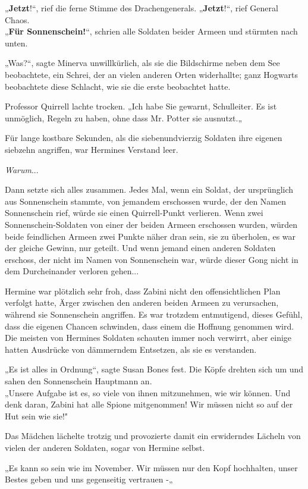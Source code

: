 {„\textbf{Jetzt}!“, rief die ferne Stimme des Drachengenerals. „\textbf{Jetzt}!“, rief General Chaos.\\ „\textbf{Für Sonnenschein!}“, schrien alle Soldaten beider Armeen und stürmten nach unten.

„Was?“, sagte Minerva unwillkürlich, als sie die Bildschirme neben dem See beobachtete, ein Schrei, der an vielen anderen Orten widerhallte; ganz Hogwarts beobachtete diese Schlacht, wie sie die erste beobachtet hatte.

Professor Quirrell lachte trocken. „Ich habe Sie gewarnt, Schulleiter. Es ist unmöglich, Regeln zu haben, ohne dass Mr. Potter sie ausnutzt.„

Für lange kostbare Sekunden, als die siebenundvierzig Soldaten ihre eigenen siebzehn angriffen, war Hermines Verstand leer.

\emph{Warum}...

Dann setzte sich alles zusammen. Jedes Mal, wenn ein Soldat, der ursprünglich aus Sonnenschein stammte, von jemandem erschossen wurde, der den Namen Sonnenschein rief, würde sie einen Quirrell-Punkt verlieren. Wenn zwei Sonnenschein-Soldaten von einer der beiden Armeen erschossen wurden, würden beide feindlichen Armeen zwei Punkte näher dran sein, sie zu überholen, es war der gleiche Gewinn, nur geteilt. Und wenn jemand einen anderen Soldaten erschoss, der nicht im Namen von Sonnenschein war, würde dieser Gong nicht in dem Durcheinander verloren gehen...

Hermine war plötzlich sehr froh, dass Zabini nicht den offensichtlichen Plan verfolgt hatte, Ärger zwischen den anderen beiden Armeen zu verursachen, während sie Sonnenschein angriffen. Es war trotzdem entmutigend, dieses Gefühl, dass die eigenen Chancen schwinden, dass einem die Hoffnung genommen wird. Die meisten von Hermines Soldaten schauten immer noch verwirrt, aber einige hatten Ausdrücke von dämmerndem Entsetzen, als sie es verstanden.

„Es ist alles in Ordnung“, sagte Susan Bones fest. Die Köpfe drehten sich um und sahen den Sonnenschein Hauptmann an.\\ „Unsere Aufgabe ist es, so viele von ihnen mitzunehmen, wie wir können. Und denk daran, Zabini hat alle Spione mitgenommen! Wir müssen nicht so auf der Hut sein wie sie!"

Das Mädchen lächelte trotzig und provozierte damit ein erwiderndes Lächeln von vielen der anderen Soldaten, sogar von Hermine selbst.

„Es kann so sein wie im November. Wir müssen nur den Kopf hochhalten, unser Bestes geben und uns gegenseitig vertrauen -„

}
